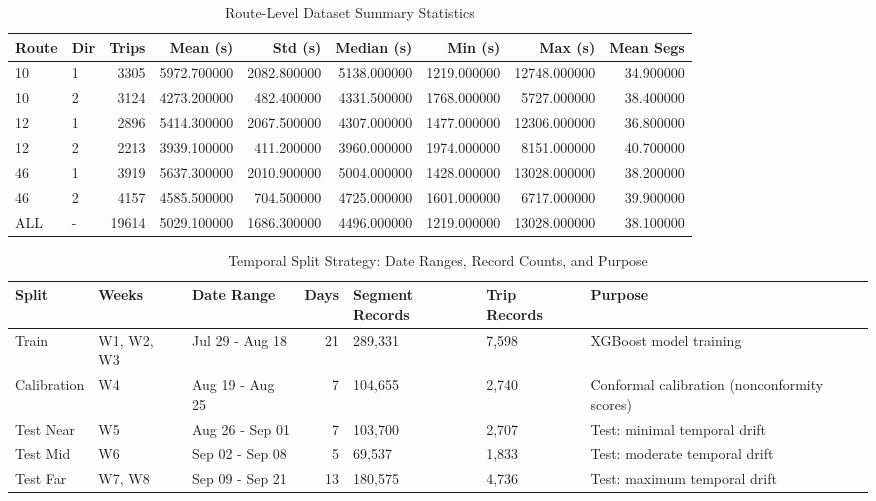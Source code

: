 \begin{table}
\caption{Route-Level Dataset Summary Statistics}
\label{tab:route_level_summary}
\begin{tabular}{llrrrrrrr}
\toprule
Route & Dir & Trips & Mean (s) & Std (s) & Median (s) & Min (s) & Max (s) & Mean Segs \\
\midrule
10 & 1 & 3305 & 5972.700000 & 2082.800000 & 5138.000000 & 1219.000000 & 12748.000000 & 34.900000 \\
10 & 2 & 3124 & 4273.200000 & 482.400000 & 4331.500000 & 1768.000000 & 5727.000000 & 38.400000 \\
12 & 1 & 2896 & 5414.300000 & 2067.500000 & 4307.000000 & 1477.000000 & 12306.000000 & 36.800000 \\
12 & 2 & 2213 & 3939.100000 & 411.200000 & 3960.000000 & 1974.000000 & 8151.000000 & 40.700000 \\
46 & 1 & 3919 & 5637.300000 & 2010.900000 & 5004.000000 & 1428.000000 & 13028.000000 & 38.200000 \\
46 & 2 & 4157 & 4585.500000 & 704.500000 & 4725.000000 & 1601.000000 & 6717.000000 & 39.900000 \\
ALL & - & 19614 & 5029.100000 & 1686.300000 & 4496.000000 & 1219.000000 & 13028.000000 & 38.100000 \\
\bottomrule
\end{tabular}
\end{table}



\begin{table}
\caption{Temporal Split Strategy: Date Ranges, Record Counts, and Purpose}
\label{tab:temporal_splits}
\begin{tabular}{lllrlll}
\toprule
Split & Weeks & Date Range & Days & Segment Records & Trip Records & Purpose \\
\midrule
Train & W1, W2, W3 & Jul 29 - Aug 18 & 21 & 289,331 & 7,598 & XGBoost model training \\
Calibration & W4 & Aug 19 - Aug 25 & 7 & 104,655 & 2,740 & Conformal calibration (nonconformity scores) \\
Test Near & W5 & Aug 26 - Sep 01 & 7 & 103,700 & 2,707 & Test: minimal temporal drift \\
Test Mid & W6 & Sep 02 - Sep 08 & 5 & 69,537 & 1,833 & Test: moderate temporal drift \\
Test Far & W7, W8 & Sep 09 - Sep 21 & 13 & 180,575 & 4,736 & Test: maximum temporal drift \\
\bottomrule
\end{tabular}
\end{table}



